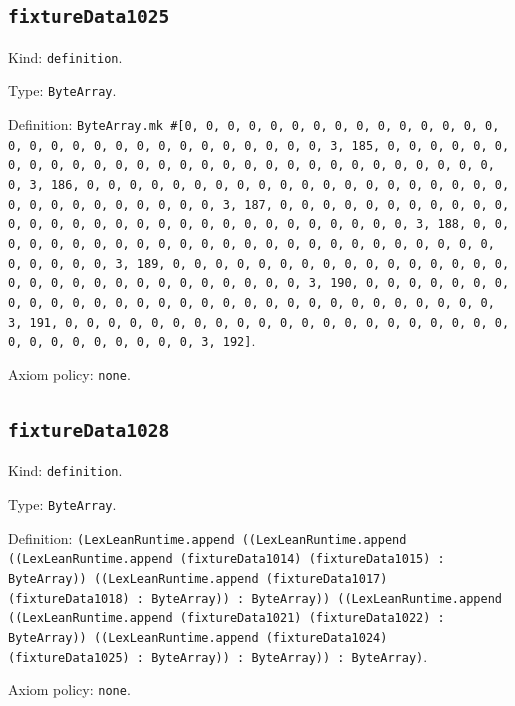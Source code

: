 \documentclass[11pt]{article}
\begin{document}
\subsection*{\texttt{fixtureData1025}}
\noindent Kind: \texttt{definition}.\par
\noindent Type: \texttt{ByteArray}.\par
\noindent Definition: \texttt{ByteArray.mk \#[0, 0, 0, 0, 0, 0, 0, 0, 0, 0, 0, 0, 0, 0, 0, 0, 0, 0, 0, 0, 0, 0, 0, 0, 0, 0, 0, 0, 0, 0, 3, 185, 0, 0, 0, 0, 0, 0, 0, 0, 0, 0, 0, 0, 0, 0, 0, 0, 0, 0, 0, 0, 0, 0, 0, 0, 0, 0, 0, 0, 0, 0, 3, 186, 0, 0, 0, 0, 0, 0, 0, 0, 0, 0, 0, 0, 0, 0, 0, 0, 0, 0, 0, 0, 0, 0, 0, 0, 0, 0, 0, 0, 0, 0, 3, 187, 0, 0, 0, 0, 0, 0, 0, 0, 0, 0, 0, 0, 0, 0, 0, 0, 0, 0, 0, 0, 0, 0, 0, 0, 0, 0, 0, 0, 0, 0, 3, 188, 0, 0, 0, 0, 0, 0, 0, 0, 0, 0, 0, 0, 0, 0, 0, 0, 0, 0, 0, 0, 0, 0, 0, 0, 0, 0, 0, 0, 0, 0, 3, 189, 0, 0, 0, 0, 0, 0, 0, 0, 0, 0, 0, 0, 0, 0, 0, 0, 0, 0, 0, 0, 0, 0, 0, 0, 0, 0, 0, 0, 0, 0, 3, 190, 0, 0, 0, 0, 0, 0, 0, 0, 0, 0, 0, 0, 0, 0, 0, 0, 0, 0, 0, 0, 0, 0, 0, 0, 0, 0, 0, 0, 0, 0, 3, 191, 0, 0, 0, 0, 0, 0, 0, 0, 0, 0, 0, 0, 0, 0, 0, 0, 0, 0, 0, 0, 0, 0, 0, 0, 0, 0, 0, 0, 0, 0, 3, 192]}.\par
\noindent Axiom policy: \texttt{none}.\par
\subsection*{\texttt{fixtureData1028}}
\noindent Kind: \texttt{definition}.\par
\noindent Type: \texttt{ByteArray}.\par
\noindent Definition: \texttt{(LexLeanRuntime.append ((LexLeanRuntime.append ((LexLeanRuntime.append (fixtureData1014) (fixtureData1015) : ByteArray)) ((LexLeanRuntime.append (fixtureData1017) (fixtureData1018) : ByteArray)) : ByteArray)) ((LexLeanRuntime.append ((LexLeanRuntime.append (fixtureData1021) (fixtureData1022) : ByteArray)) ((LexLeanRuntime.append (fixtureData1024) (fixtureData1025) : ByteArray)) : ByteArray)) : ByteArray)}.\par
\noindent Axiom policy: \texttt{none}.\par
\end{document}
